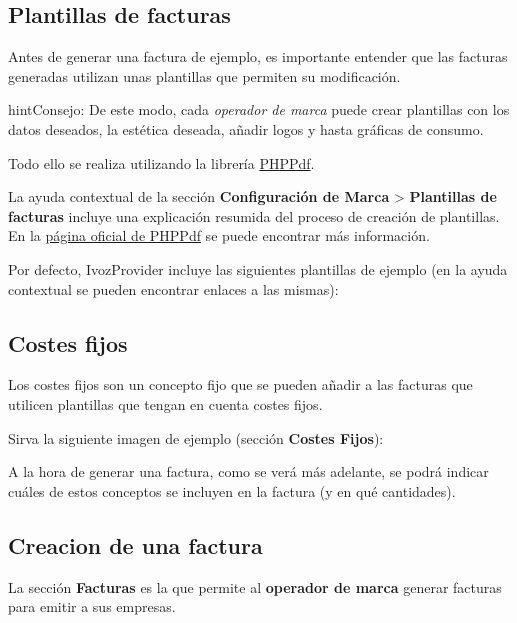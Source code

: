 \documentclass[letterpaper,10pt,spanish]{sphinxmanual}
\begin{document}
\subsection{Plantillas de facturas}
\label{billing_and_invoices/invoices:plantillas-de-facturas}
Antes de generar una factura de ejemplo, es importante entender que las facturas generadas utilizan unas plantillas que permiten su modificación.

\begin{notice}{hint}{Consejo:}
De este modo, cada \emph{operador de marca} puede crear plantillas con los datos deseados, la estética deseada, añadir logos y hasta gráficas de consumo.
\end{notice}

Todo ello se realiza utilizando la librería \href{https://github.com/psliwa/PHPPdf}{PHPPdf}.

La ayuda contextual de la sección \textbf{Configuración de Marca} \textgreater{} \textbf{Plantillas de facturas} incluye una explicación resumida del proceso de creación de plantillas. En la \href{https://github.com/psliwa/PHPPdf}{página oficial de PHPPdf} se puede encontrar más información.

Por defecto, IvozProvider incluye las siguientes plantillas de ejemplo (en la ayuda contextual se pueden encontrar enlaces a las mismas):

\noindent{}


\subsection{Costes fijos}
\label{billing_and_invoices/invoices:costes-fijos}
Los costes fijos son un concepto fijo que se pueden añadir a las facturas que utilicen plantillas que tengan en cuenta costes fijos.

Sirva la siguiente imagen de ejemplo (sección \textbf{Costes Fijos}):

\noindent{}

A la hora de generar una factura, como se verá más adelante, se podrá indicar cuáles de estos conceptos se incluyen en la factura (y en qué cantidades).


\subsection{Creacion de una factura}
\label{billing_and_invoices/invoices:creacion-de-una-factura}
La sección \textbf{Facturas} es la que permite al \textbf{operador de marca} generar facturas para emitir a sus empresas.
\end{document}
